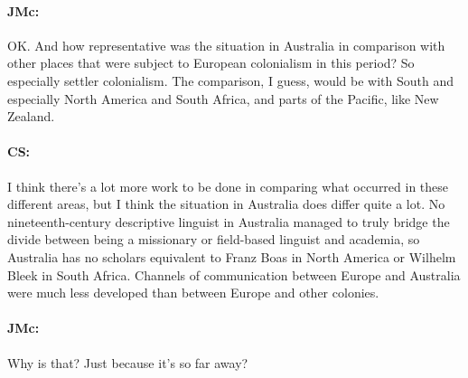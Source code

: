 \documentclass[output=paper]{langscibook}
\begin{document}
\paragraph*{JMc:}  OK. And how representative was the situation in Australia in comparison with other places that were subject to European colonialism in this period? So especially settler colonialism. The comparison, I guess, would be with South and especially North America and South Africa, and parts of the Pacific, like New Zealand.


\paragraph*{CS:}  I think there’s a lot more work to be done in comparing what occurred in these different areas, but I think the situation in Australia does differ quite a lot. No nineteenth-century descriptive linguist in Australia managed to truly bridge the divide between being a missionary or field-based linguist and academia, so Australia has no scholars equivalent to Franz Boas in North America or Wilhelm Bleek in South Africa. Channels of communication between Europe and Australia were much less developed than between Europe and other colonies.


\paragraph*{JMc:}  Why is that? Just because it’s so far away?
\end{document}

